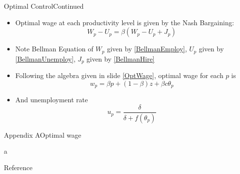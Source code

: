 \documentclass{beamer}
\begin{document}
\begin{frame}{Optimal Control}{Continued}
    \begin{itemize}
        \item Optimal wage at each productivity level is given by the Nash Bargaining: 
        \begin{equation}W_p - U_p = \beta (W_p - U_p + J_p)\end{equation}
        \item Note Bellman Equation of \(W_p\) given by \ref{BellmanEmploy}, \(U_p\) given by \ref{BellmanUnemploy}, \(J_p\) given by \ref{BellmanHire}
        \item Following the algebra given in slide \ref{OptWage}, optimal wage for each \(p\) is \[
            w_p = \beta p + (1-\beta)z + \beta c \theta_p\]
        \item And unemployment rate \begin{equation}\label{UnemployRate}
            u_p = \frac{\delta}{\delta + f(\theta_p)}
        \end{equation}
    \end{itemize}
\end{frame}

\begin{frame}{Appendix A}{Optimal wage}\label{OptWage}

    a
\end{frame}

\begin{frame}{Reference}
    \footnotesize
    

\end{frame}
\end{document}

